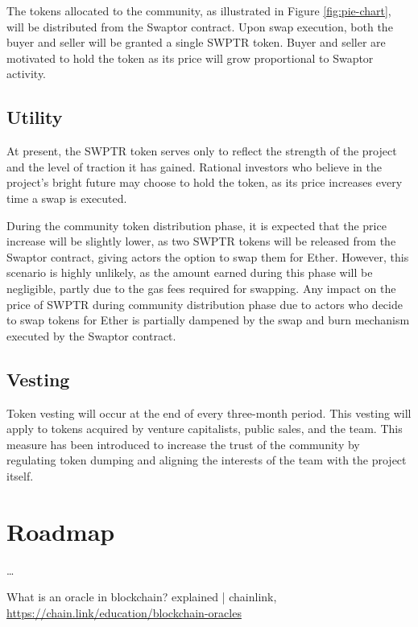 \documentclass[12pt]{article}
\begin{document}
The tokens allocated to the community, as illustrated in Figure \ref{fig:pie-chart}, will be distributed from the Swaptor contract.
Upon swap execution, both the buyer and seller will be granted a single SWPTR token.
Buyer and seller are motivated to hold the token as its price will grow proportional to Swaptor activity.

\subsection{Utility}
At present, the SWPTR token serves only to reflect the strength of the
project and the level of traction it has gained. Rational investors
who believe in the project's bright future may choose to hold the
token, as its price increases every time a swap is executed.

During the community token distribution phase, it is expected that
the price increase will be slightly lower, as two SWPTR tokens will
be released from the Swaptor contract, giving actors the option to swap
them for Ether. However, this scenario is highly unlikely, as the
amount earned during this phase will be negligible, partly due to
the gas fees required for swapping. Any impact on the price of SWPTR during
community distribution phase due to actors who decide to swap tokens
for Ether is partially dampened by the swap and burn mechanism executed
by the Swaptor contract.

\subsection{Vesting}
Token vesting will occur at the end of every three-month period.
This vesting will apply to tokens acquired by venture capitalists,
public sales, and the team. This measure has been introduced to
increase the trust of the community by regulating token dumping and 
aligning the interests of the team with the project itself.

\section{Roadmap}
\dots

\begin{thebibliography}{9}
   What is an oracle in blockchain? explained | chainlink, \url{https://chain.link/education/blockchain-oracles}
\end{thebibliography}
\end{document}
